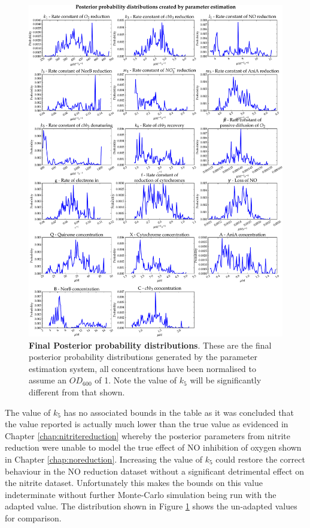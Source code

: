 \begin{figure}[tbp]
 \centering
 \includegraphics[width=15cm, trim=0cm 0cm 0cm 0cm, clip=true]{./09-completedmodel/data/posteriors.pdf}
 \caption[Final Posterior probability distributions]{{\bf Final Posterior probability distributions}. These are the final posterior probability distributions generated by the parameter estimation system, all concentrations have been normalised to assume an $OD_{600}$ of 1. Note the value of $k_5$ will be significantly different from that shown.
 \label{fig:final_posteriors}}
\end{figure}

The value of $k_5$ has no associated bounds in the table as it was concluded that the value reported is actually much lower than the true value as evidenced in Chapter \ref{chap:nitritereduction} whereby the posterior parameters from nitrite reduction were unable to model the true effect of NO inhibition of oxygen shown in Chapter \ref{chap:noreduction}. Increasing the value of $k_5$ could restore the correct behaviour in the NO reduction dataset without a significant detrimental effect on the nitrite dataset. Unfortunately this makes the bounds on this value indeterminate without further Monte-Carlo simulation being run with the adapted value. The distribution shown in Figure \ref{fig:final_posteriors} shows the un-adapted values for comparison.

